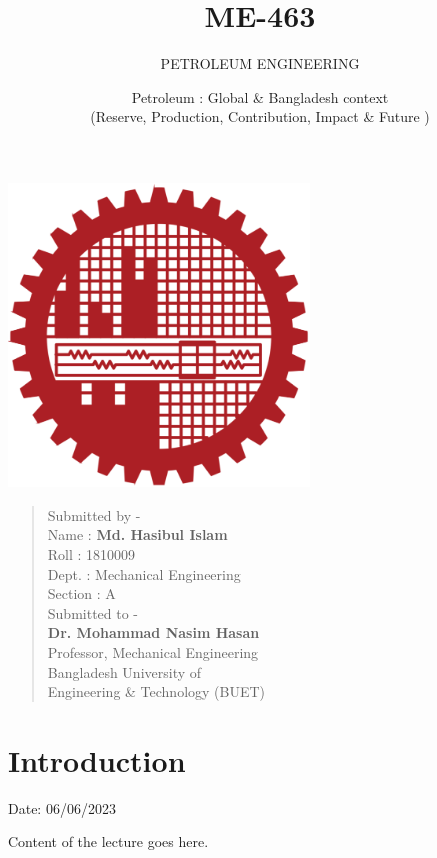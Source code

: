 \documentclass{article}
\title{ME-463}
\subtitle{PETROLEUM ENGINEERING}
\author{Petroleum : Global \& Bangladesh context \\ (Reserve, Production, Contribution, Impact \& Future )}
\begin{document}
\begin{titlepage}
    \centering
    
    {\Huge\bfseries\maketitle}
    \vspace{1cm}
    \includegraphics[width=8cm]{institution_logo.jpg}
    \vspace*{3cm}
    \begin{multicols}{2}
      \begin{quote}
        
        \begin{flushleft}
          
          \hspace{1cm} Submitted by - \\
          \hspace{1cm} Name : \textbf{Md. Hasibul Islam}\\
          \hspace{1cm} Roll : 1810009\\
          \hspace{1cm} Dept. : Mechanical Engineering\\ 
          \hspace{1cm} Section : A \\
          \hspace{1cm} Submitted to - \\
          \hspace{1cm} \textbf{Dr. Mohammad Nasim Hasan} \\ 
          \hspace{1cm} Professor, Mechanical Engineering \\ 
          \hspace{1cm} Bangladesh University of \\ \hspace{1cm} Engineering \& Technology (BUET)
        \end{flushleft}
      \end{quote}
      \end{multicols}
    \vfill
\end{titlepage}

\tableofcontents
\pagebreak
\section{Introduction} 
\hfill Date: 06/06/2023


Content of the lecture goes here.
\end{document}
